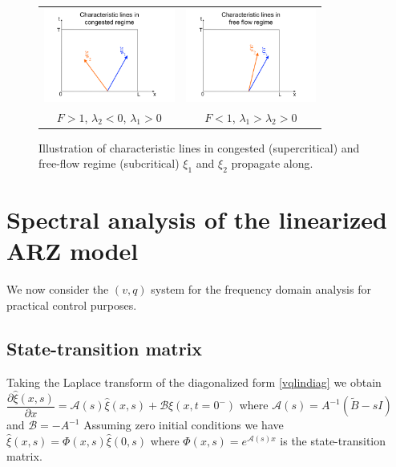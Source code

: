 \documentclass[letterpaper, 10 pt, conference]{ieeeconf}  %
\begin{document}
\begin{figure}
\begin{centering}
\begin{tabular}{cc}
\includegraphics[width=4.3cm, trim= 25mm 10mm 10mm 10mm]{Congested-regime} & 
\includegraphics[width=4.3cm, trim= 25mm 10mm 10mm 10mm]{Free-flow-regime}
\tabularnewline
$F>1$, $\lambda_{2}<0$, $\lambda_{1}>0$ & $F<1$, $\lambda_{1}>\lambda_{2}>0$\tabularnewline
\end{tabular}
\par\end{centering}
\protect\caption{Illustration of characteristic lines in congested (supercritical) and free-flow regime (subcritical) $\xi_1$ and $\xi_2$ propagate along.\label{Characteristics}}
\end{figure}


\section{Spectral analysis of the linearized ARZ model}
We now consider the $(v,q)$ system for the frequency domain analysis for practical control purposes.

\subsection{State-transition matrix}
Taking the Laplace transform of the diagonalized form \eqref{vqlindiag} we obtain 
$\dfrac{\partial \hat{\xi} (x,s)}{\partial x} = \mathscr{A}(s)\hat{\xi}(x,s) + \mathscr{B}\xi(x,t=0^-)$
where 
$\mathscr{A}(s) = A^{-1}(\tilde{B} - sI)$
and 
$\mathscr{B} = -A^{-1}$
Assuming zero initial conditions we have 
\label{TFRiemann}
$\hat{\xi}(x,s) = \Phi(x,s)\hat{\xi}(0,s)$
where
$\Phi(x,s) = e^{\mathscr{A}(s)x}$
is the state-transition matrix.
\end{document}
